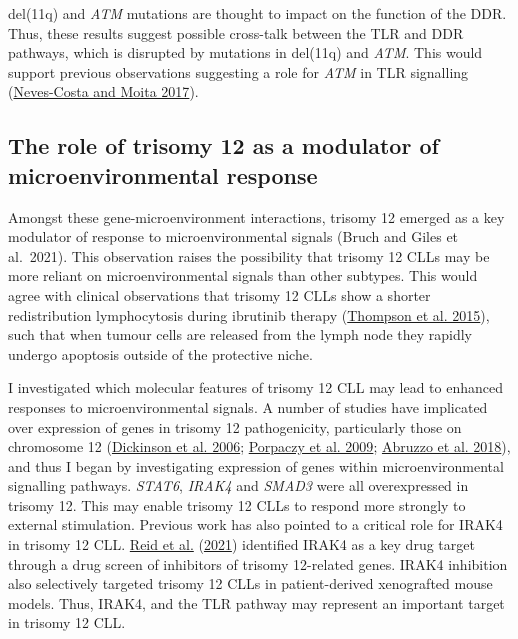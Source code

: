 \documentclass[11pt, a4paper, twosided]{book}
\begin{document}
del(11q) and \emph{ATM} mutations are thought to impact on the function of the DDR. Thus, these results suggest possible cross-talk between the TLR and DDR pathways, which is disrupted by mutations in del(11q) and \emph{ATM}. This would support previous observations suggesting a role for \emph{ATM} in TLR signalling (\protect\hyperlink{ref-Neves2017}{Neves-Costa and Moita 2017}).

\hypertarget{the-role-of-trisomy-12-as-a-modulator-of-microenvironmental-response}{%
\subsection{The role of trisomy 12 as a modulator of microenvironmental response}\label{the-role-of-trisomy-12-as-a-modulator-of-microenvironmental-response}}

Amongst these gene-microenvironment interactions, trisomy 12 emerged as a key modulator of response to microenvironmental signals (Bruch and Giles et al.~2021). This observation raises the possibility that trisomy 12 CLLs may be more reliant on microenvironmental signals than other subtypes. This would agree with clinical observations that trisomy 12 CLLs show a shorter redistribution lymphocytosis during ibrutinib therapy (\protect\hyperlink{ref-Thompson2018}{Thompson et al. 2015}), such that when tumour cells are released from the lymph node they rapidly undergo apoptosis outside of the protective niche.

I investigated which molecular features of trisomy 12 CLL may lead to enhanced responses to microenvironmental signals. A number of studies have implicated over expression of genes in trisomy 12 pathogenicity, particularly those on chromosome 12 (\protect\hyperlink{ref-Dickinson2006}{Dickinson et al. 2006}; \protect\hyperlink{ref-Porpaczy2009}{Porpaczy et al. 2009}; \protect\hyperlink{ref-Abruzzo2018}{Abruzzo et al. 2018}), and thus I began by investigating expression of genes within microenvironmental signalling pathways.
\emph{STAT6}, \emph{IRAK4} and \emph{SMAD3} were all overexpressed in trisomy 12. This may enable trisomy 12 CLLs to respond more strongly to external stimulation. Previous work has also pointed to a critical role for IRAK4 in trisomy 12 CLL. \protect\hyperlink{ref-Reid2021}{Reid et al.} (\protect\hyperlink{ref-Reid2021}{2021}) identified IRAK4 as a key drug target through a drug screen of inhibitors of trisomy 12-related genes. IRAK4 inhibition also selectively targeted trisomy 12 CLLs in patient-derived xenografted mouse models. Thus, IRAK4, and the TLR pathway may represent an important target in trisomy 12 CLL.
\end{document}
